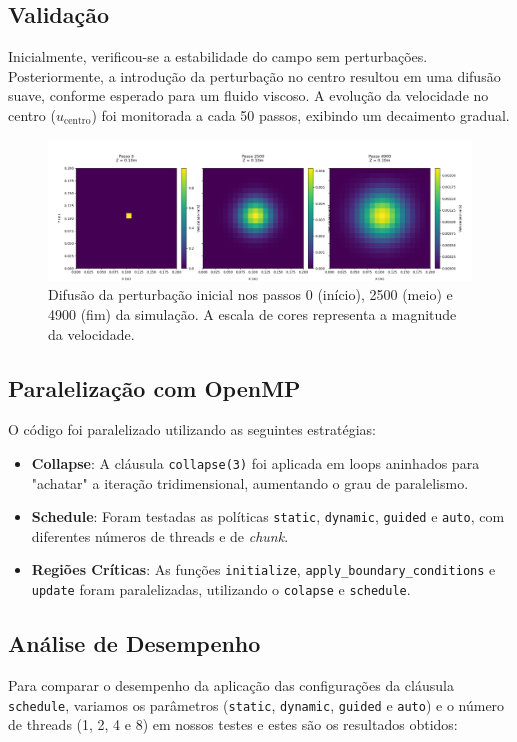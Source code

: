 \documentclass[a4paper, 12pt]{article}
\begin{document}
	\subsection{Validação}  
		\hspace{.62cm}Inicialmente, verificou-se a estabilidade do campo sem perturbações. Posteriormente, a introdução da perturbação no centro resultou em uma difusão suave, conforme esperado para um fluido viscoso. A evolução da velocidade no centro (\( u_{\text{centro}} \)) foi monitorada a cada 50 passos, exibindo um decaimento gradual.  
	
	\begin{figure}[h]
		\centering
		\includegraphics[width=\linewidth]{imgs/Figure_1.png}
		\caption{Difusão da perturbação inicial nos passos 0 (início), 2500 (meio) e 4900 (fim) da simulação. A escala de cores representa a magnitude da velocidade.}
	\end{figure}
	
	\subsection{Paralelização com OpenMP}  
	O código foi paralelizado utilizando as seguintes estratégias:  
	\begin{itemize}  
		\item \textbf{Collapse}: A cláusula \texttt{collapse(3)} foi aplicada em loops aninhados para "achatar" a iteração tridimensional, aumentando o grau de paralelismo.  
		\item \textbf{Schedule}: Foram testadas as políticas \texttt{static}, \texttt{dynamic}, \texttt{guided} e \texttt{auto}, com diferentes números de threads e de \textit{chunk}.  
		\item \textbf{Regiões Críticas}: As funções \texttt{initialize}, \texttt{apply\_boundary\_conditions} e \texttt{update} foram paralelizadas, utilizando o \texttt{colapse} e \texttt{schedule}. 
	\end{itemize}  
	
	\subsection{Análise de Desempenho}  
		\hspace{.62cm}Para comparar o desempenho da aplicação das configurações da cláusula \texttt{schedule}, variamos os parâmetros (\texttt{static}, \texttt{dynamic}, \texttt{guided} e \texttt{auto}) e o número de threads (1, 2, 4 e 8) em nossos testes e estes são os resultados obtidos:
	
\end{document}

